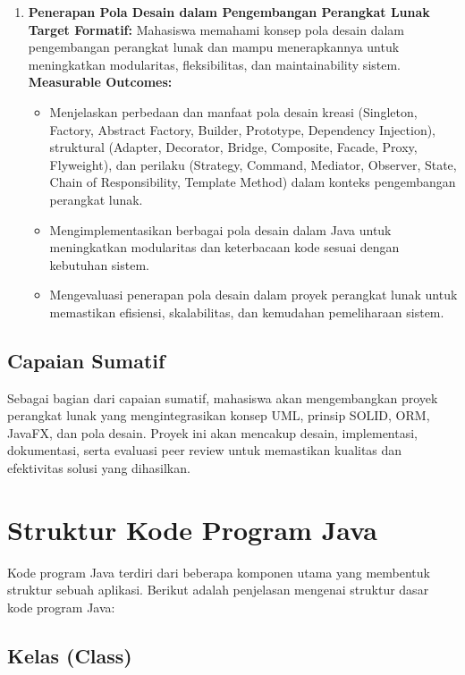 \begin{enumerate}
	
	\item \textbf{Penerapan Pola Desain dalam Pengembangan Perangkat Lunak}  \\
	\textbf{Target Formatif:} Mahasiswa memahami konsep pola desain dalam pengembangan perangkat lunak dan mampu menerapkannya untuk meningkatkan modularitas, fleksibilitas, dan maintainability sistem.  \\
	\textbf{Measurable Outcomes:}
	\begin{itemize}
		\item Menjelaskan perbedaan dan manfaat pola desain kreasi (Singleton, Factory, Abstract Factory, Builder, Prototype, Dependency Injection), struktural (Adapter, Decorator, Bridge, Composite, Facade, Proxy, Flyweight), dan perilaku (Strategy, Command, Mediator, Observer, State, Chain of Responsibility, Template Method) dalam konteks pengembangan perangkat lunak.
		\item Mengimplementasikan berbagai pola desain dalam Java untuk meningkatkan modularitas dan keterbacaan kode sesuai dengan kebutuhan sistem.
		\item Mengevaluasi penerapan pola desain dalam proyek perangkat lunak untuk memastikan efisiensi, skalabilitas, dan kemudahan pemeliharaan sistem.
	\end{itemize}
	
	
\end{enumerate}

\subsection{Capaian Sumatif}

Sebagai bagian dari capaian sumatif, mahasiswa akan mengembangkan proyek perangkat lunak yang mengintegrasikan konsep UML, prinsip SOLID, ORM, JavaFX, dan pola desain. Proyek ini akan mencakup desain, implementasi, dokumentasi, serta evaluasi peer review untuk memastikan kualitas dan efektivitas solusi yang dihasilkan.

\section{Struktur Kode Program Java}

Kode program Java terdiri dari beberapa komponen utama yang membentuk struktur sebuah aplikasi. Berikut adalah penjelasan mengenai struktur dasar kode program Java:

\subsection{Kelas (Class)}

